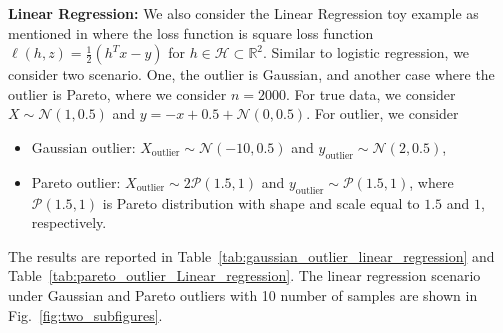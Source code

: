 \documentclass{article}
\theoremstyle{plain}
\theoremstyle{plain}
\theoremstyle{definition}
\theoremstyle{remark}
\begin{document}
\textbf{Linear Regression:} We also consider the Linear Regression toy example as mentioned in \citep{li2020tilted} where the loss function is square loss function $\ell(h,z)=\frac{1}{2}(h^Tx-y)$ for $h\in\mathcal{H}\subset \mathbb{R}^2$. Similar to logistic regression, we consider two scenario. One, the outlier is Gaussian, and another case where the outlier is Pareto, where we consider $n=2000$. For true data, we consider $X\sim\mathcal{N}(1,0.5)$ and $y=-x+0.5+\mathcal{N}(0,0.5)$. For outlier, we consider
\begin{itemize}
    \item Gaussian outlier: $X_{\text{outlier}}\sim\mathcal{N}(-10,0.5)$ and $y_{\text{outlier}}\sim\mathcal{N}(2,0.5)$,
    \item Pareto outlier: $X_{\text{outlier}}\sim 2\mathcal{P}(1.5,1)$ and $y_{\text{outlier}}\sim\mathcal{P}(1.5,1)$, where $\mathcal{P}(1.5,1)$ is Pareto distribution with shape and scale equal to $1.5$ and $1$, respectively.
\end{itemize}
The results are reported in Table~\ref{tab:gaussian_outlier_linear_regression} and Table~\ref{tab:pareto_outlier_Linear_regression}. The linear regression scenario under Gaussian and Pareto outliers with 10 number of samples are shown in Fig.~\ref{fig:two_subfigures}.
\end{document}
